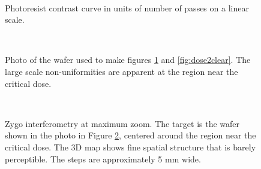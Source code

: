 \begin{figure}[h!] 
\begin{center}
\ 
\caption[Experimental photoresist contrast curve]{Photoresist contrast curve in units of number of passes on a linear scale.}
\label{fig:dose2clear2}
\end{center}
\end{figure}


\begin{figure}[h!] 
\begin{center}
\ 
\caption[Photo of experimental wafer]{Photo of the wafer used to make figures \ref{fig:dose2clear2} and \ref{fig:dose2clear}.  The large scale non-uniformities are apparent at the region near the critical dose.}
\label{fig:dose2clearphoto}
\end{center}
\end{figure}

\begin{figure}[h!] 
\begin{center}
\ 
\caption[Zygo interferometry of experimental wafer]{Zygo interferometry at maximum zoom.  The target is the wafer shown in the photo in Figure \ref{fig:dose2clearphoto}, centered around the region near the critical dose.  The 3D map shows fine spatial structure that is barely perceptible.  The steps are approximately 5 mm wide.  }
\label{fig:3dZYGOresist}
\end{center}
\end{figure}

